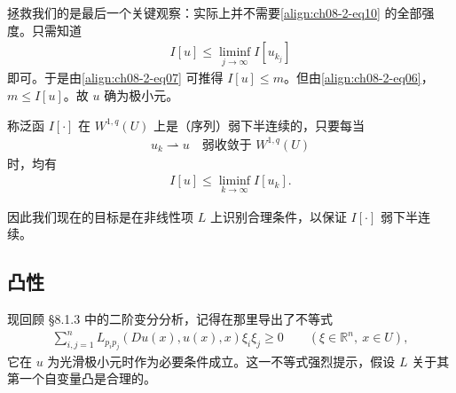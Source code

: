 \documentclass[../../main.tex]{subfiles}
\begin{document}
拯救我们的是最后一个关键观察：实际上并不需要\eqref{align:ch08-2-eq10} 的全部强度。只需知道
\begin{align}
I[u]\leqslant\liminf_{j\to\infty}I[u_{k_j}]\label{align:ch08-2-eq11}
\end{align}
即可。于是由\eqref{align:ch08-2-eq07} 可推得 $I[u]\leqslant m$。但由\eqref{align:ch08-2-eq06}，$m\leqslant I[u]$。故 $u$ 确为极小元。

\begin{definition}\label{definition:ch08-2-弱下半连续}
称泛函 $I[\cdot]$ 在 $W^{1,q}(U)$ 上是（序列）弱下半连续的，只要每当
\begin{align*}
u_k\rightharpoonup u\quad\text{弱收敛于 }W^{1,q}(U)
\end{align*}
时，均有
\begin{align*}
I[u]\leqslant\liminf_{k\to\infty}I[u_k].
\end{align*}
\end{definition}

因此我们现在的目标是在非线性项 $L$ 上识别合理条件，以保证 $I[\cdot]$ 弱下半连续。

\subsection{凸性}\label{subsection:ch08-2-2-凸性}

现回顾 \S8.1.3 中的二阶变分分析，记得在那里导出了不等式
\begin{align*}
\sum_{i,j=1}^n L_{p_ip_j}(Du(x),u(x),x)\xi_i\xi_j\geqslant 0\qquad (\xi\in\mathbb{R}^n,\ x\in U),
\end{align*}
它在 $u$ 为光滑极小元时作为必要条件成立。这一不等式强烈提示，假设 $L$ 关于其第一个自变量凸是合理的。
\end{document}
